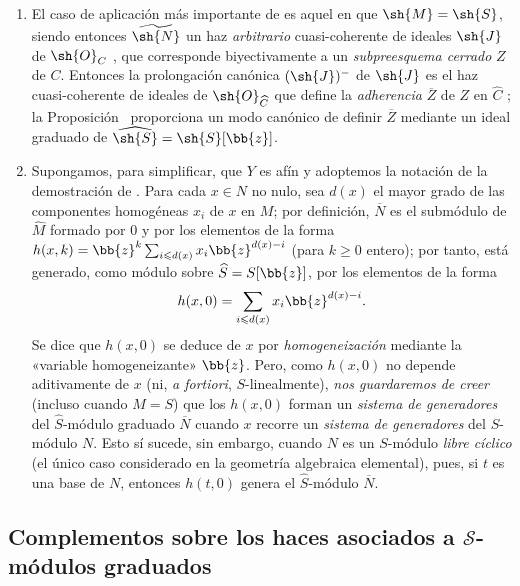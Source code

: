 \documentclass[oneside,10pt]{amsart}
\renewcommand{\leq}{\leqslant}
\renewcommand{\geq}{\geqslant}
\newcommand{\oldpage}[2][]{\marginnote{\normalfont\footnotesize\textbf{#1}~|~#2}\ignorespaces}
\let\EGAOriginalLabel\label
\renewcommand{\label}[1]{\phantomsection\EGAOriginalLabel{#1}}
\begin{document}
\begin{remark}[8.13.4]
\label{II.8.13.4}
\begin{enumerate}
    \item[\rm{(i)}] El caso de aplicación más importante de  es aquel en que $\sh{M}=\sh{S}$, siendo entonces $\widetilde{\sh{N}}$ un haz \emph{arbitrario} cuasi-coherente de ideales $\sh{J}$ de $\sh{O}_C$ , que corresponde biyectivamente a un \emph{subpreesquema cerrado} $Z$ de $C$.
        Entonces la prolongación canónica $(\sh{J})^-$ de $\sh{J}$ es el haz cuasi-coherente de ideales de $\sh{O}_{\widehat{C}}$ que define la \emph{adherencia} $\overline{Z}$ de $Z$ en $\widehat{C}$ ;
        la Proposición~ proporciona un modo canónico de definir $\overline{Z}$ mediante un ideal graduado de $\widehat{\sh{S}}=\sh{S}[\bb{z}]$.
    \item[\rm{(ii)}] Supongamos, para simplificar, que $Y$ es afín y adoptemos la notación de la demostración de .
        Para cada $x\in N$ no nulo, sea $d(x)$ el mayor grado de las componentes homogéneas $x_i$ de $x$ en $M$;
        por definición, $\overline{N}$ es el submódulo de $\widehat{M}$ formado por $0$ y por los elementos de la forma $h(x,k)=\bb{z}^k\sum_{i\leq d(x)}x_i\bb{z}^{d(x)-i}$ (para $k\geq0$ entero);
        por tanto, está generado, como módulo sobre $\widehat{S}=S[\bb{z}]$, por los elementos de la forma
        \[
            h(x,0) = \sum_{i\leq d(x)}x_i\bb{z}^{d(x)-i}.
        \]
\oldpage[II]{197}
        Se dice que $h(x,0)$ se deduce de $x$ por \emph{homogeneización} mediante la «variable homogeneizante» $\bb{z}$.
        Pero, como $h(x,0)$ no depende aditivamente de $x$ (ni, \emph{a fortiori}, $S$-linealmente), \emph{nos guardaremos de creer} (incluso cuando $M=S$) que los $h(x,0)$ forman un \emph{sistema de generadores} del $\widehat{S}$-módulo graduado $\overline{N}$ cuando $x$ recorre un \emph{sistema de generadores} del $S$-módulo $N$.
        Esto sí sucede, sin embargo, cuando $N$ es un $S$-módulo \emph{libre cíclico} (el único caso considerado en la geometría algebraica elemental), pues, si $t$ es una base de $N$, entonces $h(t,0)$ genera el $\widehat{S}$-módulo $\overline{N}$.
\end{enumerate}
\end{remark}


\subsection{Complementos sobre los haces asociados a $\mathcal{S}$-módulos graduados}
\label{subsection:II.8.14}
\end{document}
